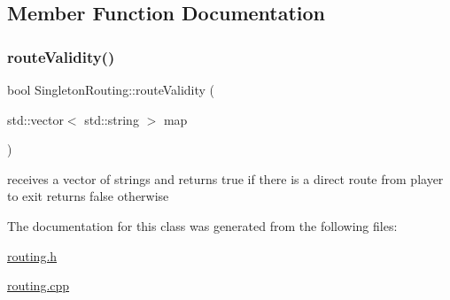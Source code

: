 \subsection{Member Function Documentation}
\hypertarget{class_singleton_routing_a2d5ddb26bf336e4877344353170bab61}{}\label{class_singleton_routing_a2d5ddb26bf336e4877344353170bab61} 
\subsubsection{\texorpdfstring{route\+Validity()}{routeValidity()}}
{\footnotesize\ttfamily bool Singleton\+Routing\+::route\+Validity (\begin{DoxyParamCaption}\item[{std\+::vector$<$ std\+::string $>$}]{map }\end{DoxyParamCaption})}

receives a vector of strings and returns true if there is a direct route from player to exit returns false otherwise 

The documentation for this class was generated from the following files\+:\begin{DoxyCompactItemize}
\item 
\hyperlink{routing_8h}{routing.\+h}\item 
\hyperlink{routing_8cpp}{routing.\+cpp}\end{DoxyCompactItemize}
